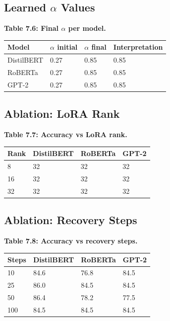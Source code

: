 \subsection{Learned $\alpha$ Values}

\textbf{Table 7.6: Final $\alpha$ per model.}

\begin{table}[H]
\centering
\small
\begin{tabular}{llll}
\toprule
\textbf{Model} & \textbf{$\alpha$ initial} & \textbf{$\alpha$ final} & \textbf{Interpretation} \\
\midrule
DistilBERT & 0.27 & 0.85 & 0.85 \\
RoBERTa & 0.27 & 0.85 & 0.85 \\
GPT-2 & 0.27 & 0.85 & 0.85 \\
\bottomrule
\end{tabular}
\end{table}

\subsection{Ablation: LoRA Rank}

\textbf{Table 7.7: Accuracy vs LoRA rank.}

\begin{table}[H]
\centering
\small
\begin{tabular}{llll}
\toprule
\textbf{Rank} & \textbf{DistilBERT} & \textbf{RoBERTa} & \textbf{GPT-2} \\
\midrule
8 & 32 & 32 & 32 \\
16 & 32 & 32 & 32 \\
32 & 32 & 32 & 32 \\
\bottomrule
\end{tabular}
\end{table}

\subsection{Ablation: Recovery Steps}

\textbf{Table 7.8: Accuracy vs recovery steps.}

\begin{table}[H]
\centering
\small
\begin{tabular}{llll}
\toprule
\textbf{Steps} & \textbf{DistilBERT} & \textbf{RoBERTa} & \textbf{GPT-2} \\
\midrule
10 & 84.6 & 76.8 & 84.5 \\
25 & 86.0 & 84.5 & 84.5 \\
50 & 86.4 & 78.2 & 77.5 \\
100 & 84.5 & 84.5 & 84.5 \\
\bottomrule
\end{tabular}
\end{table}

